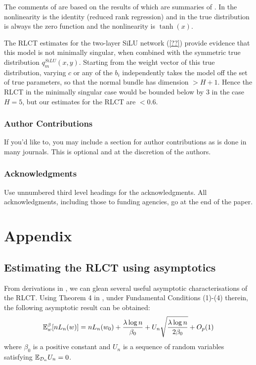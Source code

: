 \documentclass{article} %
\begin{document}
The comments of \citep[\S 7.6]{watanabe_algebraic_2009} are based on the results of \citep[\S 7.2]{watanabe_algebraic_2009} which are summaries of \cite{??,??}. In \cite{??} the nonlinearity is the identity (reduced rank regression) and in \cite{??} the true distribution is always the zero function and the nonlinearity is $\operatorname{tanh}(x)$.

The RLCT estimates for the two-layer SiLU network (\ref{??}) provide evidence that this model is not minimally singular, when combined with the symmetric true distribution $q^{SiLU}_m(x,y)$. Starting from the weight vector of this true distribution, varying $c$ or any of the $b_i$ independently takes the model off the set of true parameters, so that the normal bundle has dimension $> H + 1$. Hence the RLCT in the minimally singular case would be bounded below by $3$ in the case $H = 5$, but our estimates for the RLCT are $< 0.6$.

\subsubsection*{Author Contributions}
If you'd like to, you may include  a section for author contributions as is done
in many journals. This is optional and at the discretion of the authors.

\subsubsection*{Acknowledgments}
Use unnumbered third level headings for the acknowledgments. All
acknowledgments, including those to funding agencies, go at the end of the paper.





\appendix
\section{Appendix}

\subsection{Estimating the RLCT using asymptotics}
\label{appendix:RLCT_estimation}

From derivations in \citep{watanabe_widely_2013}, we can glean several useful asymptotic characterisations of the RLCT. Using Theorem 4 in \cite{watanabe_widely_2013}, under Fundamental Conditions (1)-(4) therein, the following asymptotic result can be obtained: 
\begin{equation}
    {\mathbb{E}}_w^\beta [nL_n(w)] = nL_n(w_0) + \frac{\lambda \log n}{\beta_0} + U_n \sqrt{\frac{\lambda \log n}{2 \beta_0}} + O_p(1)
    \label{eq:Theorem4_WBIC}
\end{equation}
where $\beta_0$ is a positive constant and $U_n$ is a sequence of random variables satisfying $\mathbb{E}_{\mathcal D_n} U_n = 0$. %
\end{document}
